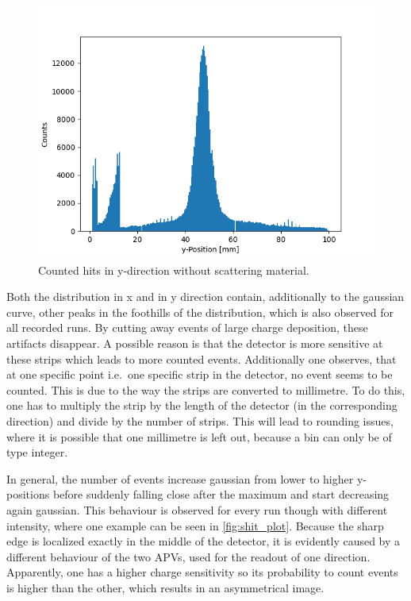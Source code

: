 \documentclass[sn-mathphys-num,iicol]{sn-jnl}
\theoremstyle{thmstyleone}
\theoremstyle{thmstyletwo}
\theoremstyle{thmstylethree}
\begin{document}
\begin{figure}
  \includegraphics[width=0.9\linewidth]{../src/elsa/finished_plots/unfiltered_noMaterial.png}
  \caption{Counted hits in y-direction without scattering material.}
  \label{fig:y_hist_notarget}
\end{figure}

Both the distribution in x and in y direction contain, additionally to the gaussian curve, other peaks in the foothills of the distribution, which is also observed for all recorded runs.
By cutting away events of large charge deposition, these artifacts disappear. 
A possible reason is that the detector is more sensitive at these strips which leads to more counted events.
Additionally one observes, that at one specific point i.e.\ one specific strip in the detector, no event seems to be counted.
This is due to the way the strips are converted to millimetre.
To do this, one has to multiply the strip by the length of the detector (in the corresponding direction) and divide by the number of strips.
This will lead to rounding issues, where it is possible that one millimetre is left out, because a bin can only be of type integer.

In general, the number of events increase gaussian from lower to higher y-positions before suddenly falling close after the maximum and start decreasing again gaussian. 
This behaviour is observed for every run though with different intensity, where one example can be seen in \autoref{fig:shit_plot}. 
Because the sharp edge is localized exactly in the middle of the detector, it is evidently caused by a different behaviour of the two APVs, used for the readout of one direction. 
Apparently, one has a higher charge sensitivity so its probability to count events is higher than the other, which results in an asymmetrical image. 
\end{document}
